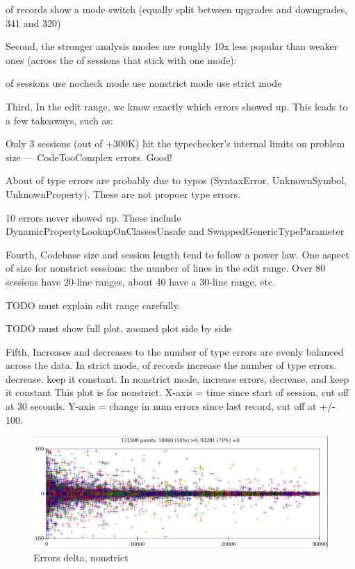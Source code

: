 \documentclass[english,submission,cleveref]{programming}
\begin{document}
 of records show a mode switch (equally split between upgrades and
downgrades, 341 and 320)


Second,
the stronger analysis modes are roughly 10x less popular than weaker ones
(across the  of sessions that stick with one mode):

 of sessions use nocheck mode
 use nonstrict mode
 use strict mode

Third,
In the edit range, we know exactly which errors showed up. This leads to a few
takeaways, such as:

Only 3 sessions (out of +300K) hit the typechecker's internal limits on problem
size --- CodeTooComplex errors. Good!

About  of type errors are probably due to typos (SyntaxError, UnknownSymbol,
UnknownProperty). These are not propoer type errors.

10 errors never showed up. These include DynamicPropertyLookupOnClassesUnsafe and
SwappedGenericTypeParameter


Fourth,
Codebase size and session length tend to follow a power law. 
One aspect of size for nonstrict sessions: the number of
lines in the edit range. Over 80 sessions have 20-line ranges, about 40 have a
30-line range, etc.

TODO must explain edit range carefully.

TODO must show full plot, zoomed plot side by side

Fifth,
Increases and decreases to the number of type errors are evenly balanced across
the data.
In strict mode,  of records increase the number of type errors. 
decrease.  keep it constant.
In nonstrict mode,  increase errors,  decrease, and 
keep it constant
This plot is for nonstrict. X-axis = time since start of session, cut off at 30
seconds. Y-axis = change in num errors since last record, cut off at +/- 100.

\begin{figure}[t]
  \includegraphics[width=0.8\columnwidth]{img/example-error-delta.png}
  \caption{Errors delta, nonstrict}
  \label{f:error-delta}
\end{figure}
\end{document}
